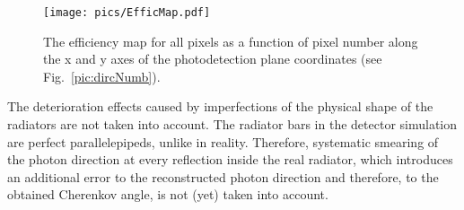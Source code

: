 \begin{figure}[!h]
\centering
\texttt{[image: pics/EfficMap.pdf]}
\caption{\label{pic:effmap}
The efficiency map for all pixels as a function of pixel number along the x and y axes of the photodetection plane coordinates (see Fig.~\ref{pic:dircNumb}).}
\end{figure}

The deterioration effects caused by imperfections of the physical shape of the radiators are not taken into account. The radiator bars in the detector simulation are perfect parallelepipeds, unlike in reality. Therefore, systematic smearing of the photon direction at every reflection inside the real radiator, which introduces an additional error to the reconstructed photon direction and therefore, to the obtained Cherenkov angle, is not (yet) taken into account.
